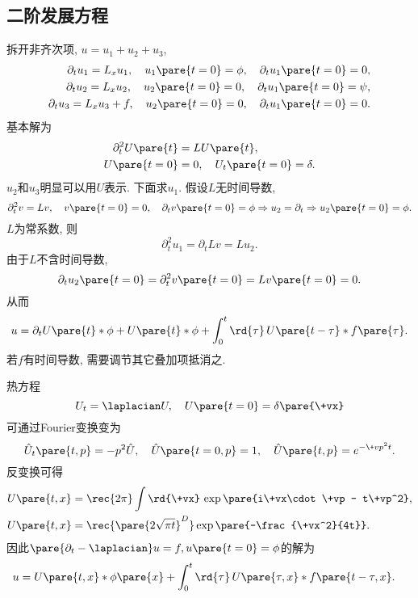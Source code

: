 \documentclass[hidelinks]{ctexart}
\begin{document}

\subsection{二阶发展方程} %
\label{sub:二阶发展方程}

拆开非齐次项, $u = u_1 + u_2 + u_3$,
\begin{align*}
    \partial_t u_1 = L_x u_1,\quad u_1\pare{t=0} = \phi,\quad \partial_t u_1\pare{t=0} = 0, \\
    \partial_t u_2 = L_x u_2,\quad u_2\pare{t=0} = 0,\quad \partial_t u_1\pare{t=0} = \psi, \\
    \partial_t u_3 = L_x u_3+f,\quad u_2\pare{t=0} = 0,\quad \partial_t u_1\pare{t=0} = 0.
\end{align*}
基本解为
\begin{align*}
    \partial_t^2 U\pare{t} &= LU\pare{t}, \\
    U\pare{t=0} &= 0,\quad U_t\pare{t=0} = \delta.
\end{align*}
\newpoint{}$u_2$和$u_3$明显可以用$U$表示. 下面求$u_1$.
\newpoint{}假设$L$无时间导数,
\[ \partial_t^2 v = Lv,\quad v\pare{t=0} = 0,\quad \partial_t v\pare{t=0} = \phi \Rightarrow u_2 = \partial_t \Rightarrow u_2 \pare{t=0} = \phi. \]
\newpoint{}$L$为常系数, 则
\[ \partial_t^2 u_1 = \partial_t Lv = Lu_2. \]
\newpoint{}由于$L$不含时间导数,
\[ \partial_t u_2\pare{t=0} = \partial_t^2 v\pare{t=0} = Lv\pare{t=0} = 0. \]
从而
\[ u = \partial_t U\pare{t} * \phi + U\pare{t} * \phi + \int_0^t \rd{\tau}\, U\pare{t-\tau}*f\pare{\tau}. \]
\newpoint{}若$f$有时间导数, 需要调节其它叠加项抵消之.

\begin{sample}
    \begin{ex}
        热方程
        \[ U_t = \laplacian U,\quad U\pare{t=0} = \delta\pare{\+vx} \]
        可通过Fourier变换变为
        \[ \hat U_t\pare{t,p} = -p^2\hat U,\quad \hat U\pare{t=0,p} = 1,\quad \hat U\pare{t,p} = e^{-\+vp^2 t}. \]
        反变换可得
        \begin{align*}
            U\pare{t,x} &= \rec{2\pi} \int \rd{\+vx}\, \exp\pare{i\+vx\cdot \+vp - t\+vp^2}, \\
            U\pare{t,x} &= \rec{\pare{2\sqrt{\pi t}}^D} \exp\pare{-\frac{\+vx^2}{4t}}.
        \end{align*}
        因此$\pare{\partial_t - \laplacian}u = f,u\pare{t=0}=\phi$的解为
        \begin{align*}
            u &= U\pare{t,x}*\phi\pare{x} + \int_0^t \rd{\tau}\,U\pare{\tau,x}* f\pare{t-\tau,x}.
        \end{align*}
    \end{ex}
\end{sample}
\end{document}
